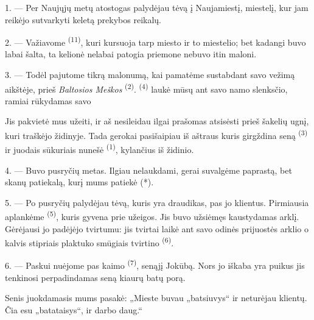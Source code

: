 \VUsaut{4.0mm}
\VUsaut{3.0mm}
\VUfilet{16mm}
\VUsaut{5.6mm}
\VUsaut{3.0mm}

\VUsaut{3.0mm}

\VUsaut{4.0mm}

1. --- Per Naujųjų metų atostogas palydėjau tėvą į Naujamiestį, miestelį, kur jam
reikėjo sutvarkyti keletą prekybos reikalų.

2. --- Važiavome  \textsuperscript{(11)}, kuri kursuoja tarp
miesto ir to miestelio; bet kadangi buvo labai šalta, ta kelionė nelabai patogia
priemone nebuvo itin maloni.

3. --- Todėl pajutome tikrą malonumą, kai pamatėme  sustabdant savo
vežimą aikštėje, prieš \textit{Baltosios Meškos}  \textsuperscript{(2)}.
 \textsuperscript{(4)} laukė mūsų ant savo namo slenksčio,
ramiai rūkydamas savo 

Jis pakvietė mus užeiti, ir aš nesileidau ilgai prašomas atsisėsti prieš šakelių
ugnį, kuri traškėjo židinyje. Tada gerokai pasišaipiau iš aštraus  kuris girgždina seną  \textsuperscript{(3)} ir juodais sūkuriais
nunešė  \textsuperscript{(1)}, kylančius iš židinio.

4. --- Buvo pusryčių metas. Ilgiau nelaukdami, gerai suvalgėme paprastą, bet skanų
patiekalą, kurį mums patiekė (*).

\VUsaut{3.0mm}

5. --- Po pusryčių palydėjau tėvą, kuris yra draudikas, pas jo klientus. Pirmiausia
aplankėme  \textsuperscript{(5)}, kuris gyvena prie užeigos. Jis buvo
užsiėmęs kaustydamas arklį. Gėrėjausi jo padėjėjo tvirtumu: jis tvirtai laikė ant
savo odinės prijuostės arklio  o kalvis stipriais plaktuko smūgiais
tvirtino  \textsuperscript{(6)}.

6. --- Paskui nuėjome pas kaimo  \textsuperscript{(7)}, senąjį
Jokūbą. Nors jo iškaba yra puikus  jis tenkinosi perpadindamas seną
kiaurų batų porą.

Senis juokdamasis mums pasakė: „Mieste buvau „batsiuvys“ ir neturėjau klientų. Čia
esu „batataisys“, ir darbo daug.“

